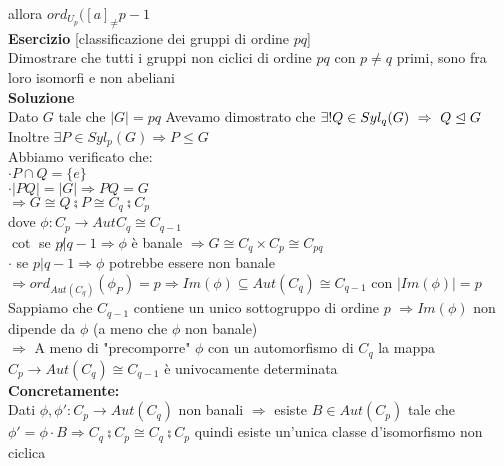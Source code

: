 \documentclass[12px]{article}
\begin{document}
{allora  $ord_{U_p}([a]_\neq p- 1$\\
\textbf{Esercizio} [classificazione dei gruppi di ordine $pq$]\\
Dimostrare che tutti i gruppi non ciclici di ordine $pq$ con  $p\neq q$ primi, sono fra loro isomorfi e non abeliani\\
\textbf{Soluzione}\\
Dato $G$ tale che $|G| = pq$
Avevamo dimostrato che $\exists ! Q\in Syl_q(G) \ \Rightarrow \ Q\trianglelefteq G$\\
Inoltre $\exists P\in Syl_p(G) \Rightarrow P\leq G$  \\
Abbiamo verificato che:\\
$\cdot P\cap Q = \{e\}$\\
 $\cdot |PQ| = |G| \Rightarrow PQ = G$ \\
 $ \Rightarrow G\cong Q\semi P \cong C_q\semi C_p$\\
 dove $\phi : C_p \rightarrow Aut C_q\cong C_{q-1}$\\
 $\cot$ se $p\not | q-1 \Rightarrow \phi$ è banale $ \Rightarrow G\cong C_q\times C_p\cong C_{pq}$\\
 $\cdot$ se $p | q-1 \Rightarrow \phi$ potrebbe essere non banale $ \Rightarrow ord_{Aut(C_q)}(\phi_P) = p \Rightarrow Im(\phi)\subseteq Aut(C_q)\cong C_{q-1}$ con $|Im(\phi)| = p$\\
 Sappiamo che  $C_{q-1}$ contiene un unico sottogruppo di ordine $p$ $ \Rightarrow Im(\phi)$ non dipende da $\phi$ (a meno che $\phi$ non banale)\\
 $ \Rightarrow $ A meno di "precomporre" $\phi$ con un automorfismo di $C_q$ la mappa $C_p \rightarrow Aut(C_q)\cong C_{q-1}$ è univocamente determinata\\
 \textbf{Concretamente:}\\
 Dati $\phi,\phi': C_p \rightarrow Aut(C_q)$ non banali $ \Rightarrow $ esiste $B\in Aut(C_p)$ tale che $\phi' = \phi\cdot B \Rightarrow C_q\semi C_p\cong C_q\semi C_p$ quindi esiste un'unica classe d'isomorfismo non ciclica\\
 \newpage
}
\end{document}
